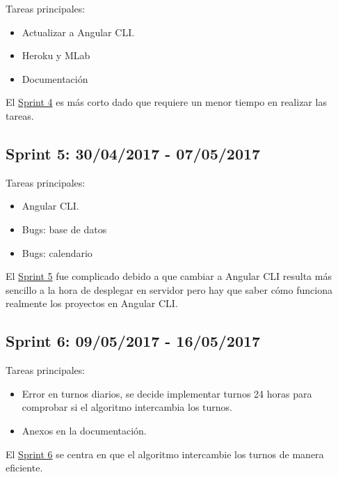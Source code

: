 Tareas principales:

\begin{itemize}
	\item Actualizar a Angular CLI.
	\item Heroku y MLab
	\item Documentación
\end{itemize}


El \underline{Sprint 4} es más corto dado que requiere un menor tiempo en realizar las tareas.

\subsection{Sprint 5: 30/04/2017 - 07/05/2017}\label{sprint5}

Tareas principales:

\begin{itemize}
	\item Angular CLI.
	\item Bugs: base de datos 
	\item Bugs: calendario
\end{itemize}


El \underline{Sprint 5} fue complicado debido a que cambiar a Angular CLI resulta más sencillo a la hora de desplegar en servidor pero hay que saber cómo funciona realmente los proyectos en Angular CLI.

\subsection{Sprint 6: 09/05/2017 - 16/05/2017}\label{sprint6}

Tareas principales:

\begin{itemize}
	
		\item Error en turnos diarios, se decide implementar turnos 24 horas para comprobar si el algoritmo intercambia los turnos.
	\item Anexos en la documentación.
\end{itemize}


El \underline{Sprint 6} se centra en que el algoritmo intercambie los turnos de manera eficiente. 

